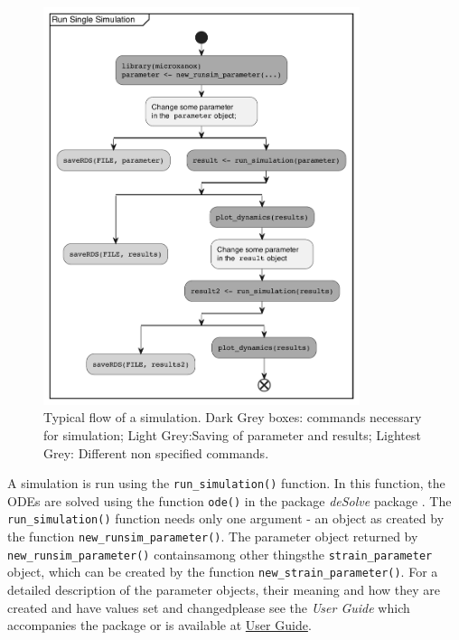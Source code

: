 \documentclass[]{elsarticle} %
\providecommand{\DIFaddtex}[1]{{\protect\color{blue}\uwave{#1}}} %
\providecommand{\DIFaddbegin}{} %
\providecommand{\DIFaddend}{} %
\providecommand{\DIFaddbeginFL}{} %
\providecommand{\DIFaddendFL}{} %
\providecommand{\DIFdelbeginFL}{} %
\providecommand{\DIFdelendFL}{} %
\providecommand{\DIFadd}[1]{\texorpdfstring{\DIFaddtex{#1}}{#1}} %
\newcommand{\DIFscaledelfig}{0.5}
\newlength{\DIFdelgraphicswidth} %
\newlength{\DIFdelgraphicsheight} %
\newcommand{\DIFaddincludegraphics}[2][]{{\color{blue}\fbox{\DIFOincludegraphics[#1]{#2}}}} %
\newcommand{\DIFdelincludegraphics}[2][]{%
\sbox{\DIFdelgraphicsbox}{\DIFOincludegraphics[#1]{#2}}%
\settoboxwidth{\DIFdelgraphicswidth}{\DIFdelgraphicsbox} %
\settoboxtotalheight{\DIFdelgraphicsheight}{\DIFdelgraphicsbox} %
\scalebox{\DIFscaledelfig}{%
\parbox[b]{\DIFdelgraphicswidth}{\usebox{\DIFdelgraphicsbox}\\[-\baselineskip] \rule{\DIFdelgraphicswidth}{0em}}\llap{\resizebox{\DIFdelgraphicswidth}{\DIFdelgraphicsheight}{%
\setlength{\unitlength}{\DIFdelgraphicswidth}%
\begin{picture}(1,1)%
\thicklines\linethickness{2pt} %
{\color[rgb]{1,0,0}\put(0,0){\framebox(1,1){}}}%
{\color[rgb]{1,0,0}\put(0,0){\line( 1,1){1}}}%
{\color[rgb]{1,0,0}\put(0,1){\line(1,-1){1}}}%
\end{picture}%
}\hspace*{3pt}}} %
} %
\DeclareRobustCommand{\DIFaddbegin}{\DIFOaddbegin \let\includegraphics\DIFaddincludegraphics} %
\DeclareRobustCommand{\DIFaddend}{\DIFOaddend \let\includegraphics\DIFOincludegraphics} %
\DeclareRobustCommand{\DIFaddbeginFL}{\DIFOaddbeginFL \let\includegraphics\DIFaddincludegraphics} %
\DeclareRobustCommand{\DIFaddendFL}{\DIFOaddendFL \let\includegraphics\DIFOincludegraphics} %
\DeclareRobustCommand{\DIFdelbeginFL}{\DIFOdelbeginFL \let\includegraphics\DIFdelincludegraphics} %
\DeclareRobustCommand{\DIFdelendFL}{\DIFOaddendFL \let\includegraphics\DIFOincludegraphics} %
\begin{document}
\begin{figure}

{\centering \includegraphics[width=350px]{./figures/simflow} 

}

\caption{Typical flow of a simulation. Dark Grey boxes: commands necessary for simulation; Light Grey:Saving of parameter and results; Lightest Grey: Different non specified commands.}\DIFdelbeginFL %
\DIFdelendFL \DIFaddbeginFL \label{fig:runsimexample}
\DIFaddendFL \end{figure}

A simulation is run using the \texttt{run\_simulation()} function. In this function, the ODEs are solved using the function \texttt{ode()} in the package \emph{deSolve} package \citep{Soetaert2010}. The \texttt{run\_simulation()} function needs only one argument - an object as created by the function \texttt{new\_runsim\_parameter()}. The parameter object returned by \texttt{new\_runsim\_parameter()} contains\DIFaddbegin \DIFadd{, }\DIFaddend among other things\DIFaddbegin \DIFadd{, }\DIFaddend the \texttt{strain\_parameter} object, which can be created by the function \texttt{new\_strain\_parameter()}. For a detailed description of the parameter objects, their meaning and how they are created and have values set and changed\DIFaddbegin \DIFadd{, }\DIFaddend please see the \emph{User Guide} which accompanies the package or is available at \href{https://uzh-peg.r-universe.dev/articles/microxanox/User-guide.html}{User Guide}.
\end{document}
